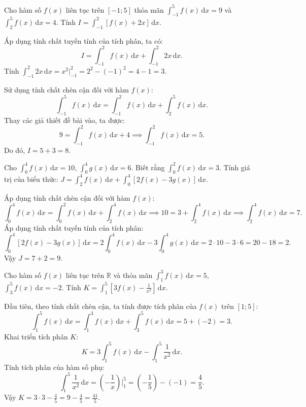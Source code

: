 \documentclass[12pt]{article}
\begin{document}
	\begin{vidu}
		Cho hàm số $f(x)$ liên tục trên $[-1; 5]$ thỏa mãn $\displaystyle \int_{-1}^{5} f(x)\,\mathrm{d}x = 9$ và $\displaystyle \int_{2}^{5} f(x)\,\mathrm{d}x = 4$. Tính $I = \displaystyle \int_{-1}^{2} [f(x) + 2x]\,\mathrm{d}x$.
	\end{vidu}
	\begin{loigiai}
		Áp dụng tính chất tuyến tính của tích phân, ta có:
		\[
		I = \int_{-1}^{2} f(x)\,\mathrm{d}x + \int_{-1}^{2} 2x\,\mathrm{d}x.
		\]
		Tính $\displaystyle \int_{-1}^{2} 2x\,\mathrm{d}x = x^2 \Big|_{-1}^{2} = 2^2 - (-1)^2 = 4 - 1 = 3$.
		
		Sử dụng tính chất chèn cận đối với hàm $f(x)$:
		\[
		\int_{-1}^{5} f(x)\,\mathrm{d}x = \int_{-1}^{2} f(x)\,\mathrm{d}x + \int_{2}^{5} f(x)\,\mathrm{d}x.
		\]
		Thay các giả thiết đề bài vào, ta được:
		\[
		9 = \int_{-1}^{2} f(x)\,\mathrm{d}x + 4 \implies \int_{-1}^{2} f(x)\,\mathrm{d}x = 5.
		\]
		Do đó, $I = 5 + 3 = 8$.
	\end{loigiai}

	\begin{vidu}
		Cho $\displaystyle \int_{0}^{4} f(x)\,\mathrm{d}x = 10$, $\displaystyle \int_{0}^{4} g(x)\,\mathrm{d}x = 6$. Biết rằng $\displaystyle \int_{0}^{2} f(x)\,\mathrm{d}x = 3$. Tính giá trị của biểu thức: $J = \displaystyle \int_{2}^{4} f(x)\,\mathrm{d}x + \int_{0}^{4} [2f(x) - 3g(x)]\,\mathrm{d}x$.
	\end{vidu}
	\begin{loigiai}
		Áp dụng tính chất chèn cận đối với hàm $f(x)$:
		\[
		\int_{0}^{4} f(x)\,\mathrm{d}x = \int_{0}^{2} f(x)\,\mathrm{d}x + \int_{2}^{4} f(x)\,\mathrm{d}x \implies 10 = 3 + \int_{2}^{4} f(x)\,\mathrm{d}x \implies \int_{2}^{4} f(x)\,\mathrm{d}x = 7.
		\]
		Áp dụng tính chất tuyến tính của tích phân:
		\[
		\int_{0}^{4} [2f(x) - 3g(x)]\,\mathrm{d}x = 2 \int_{0}^{4} f(x)\,\mathrm{d}x - 3 \int_{0}^{4} g(x)\,\mathrm{d}x = 2 \cdot 10 - 3 \cdot 6 = 20 - 18 = 2.
		\]
		Vậy $J = 7 + 2 = 9$.
	\end{loigiai}

	\begin{vidu}
		Cho hàm số $f(x)$ liên tục trên $\mathbb{R}$ và thỏa mãn $\displaystyle \int_{1}^{3} f(x)\,\mathrm{d}x = 5$, $\displaystyle \int_{3}^{5} f(x)\,\mathrm{d}x = -2$. Tính $\displaystyle K = \int_{1}^{5} \left[ 3f(x) - \frac{1}{x^2} \right]\,\mathrm{d}x$.
	\end{vidu}
	\begin{loigiai}
		Đầu tiên, theo tính chất chèn cận, ta tính được tích phân của $f(x)$ trên $[1; 5]$:
		\[
		\int_{1}^{5} f(x)\,\mathrm{d}x = \int_{1}^{3} f(x)\,\mathrm{d}x + \int_{3}^{5} f(x)\,\mathrm{d}x = 5 + (-2) = 3.
		\]
		Khai triển tích phân $K$:
		\[
		K = 3 \int_{1}^{5} f(x)\,\mathrm{d}x - \int_{1}^{5} \frac{1}{x^2}\,\mathrm{d}x.
		\]
		Tính tích phân của hàm số phụ:
		\[
		\int_{1}^{5} \frac{1}{x^2}\,\mathrm{d}x = \left( -\frac{1}{x} \right) \Bigg|_{1}^{5} = \left( -\frac{1}{5} \right) - (-1) = \frac{4}{5}.
		\]
		Vậy $K = 3 \cdot 3 - \frac{4}{5} = 9 - \frac{4}{5} = \frac{41}{5}$.
	\end{loigiai}
	
\end{document}
